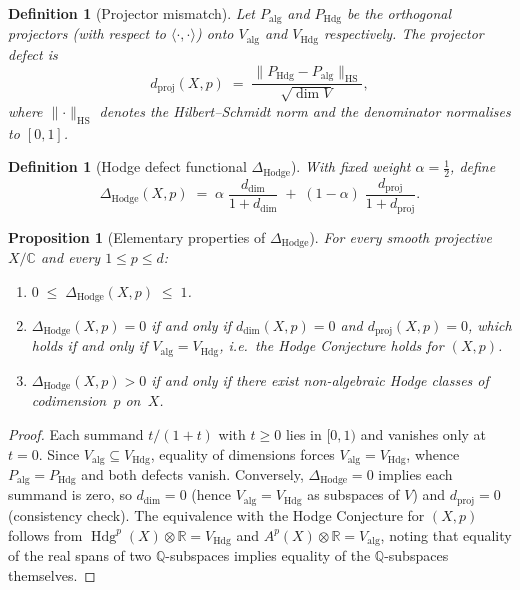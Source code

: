 \documentclass[11pt]{article}
\newtheorem{proposition}[theorem]{Proposition}
\newtheorem{definition}[theorem]{Definition}
\theoremstyle{definition}
\DeclareMathOperator{\Hdg}{Hdg}
\begin{document}
\begin{definition}[Projector mismatch]
\label{def:proj-mismatch}
Let $P_{\mathrm{alg}}$ and $P_{\mathrm{Hdg}}$ be the orthogonal
projectors (with respect to $\langle\cdot,\cdot\rangle$) onto
$V_{\mathrm{alg}}$ and $V_{\mathrm{Hdg}}$ respectively.  The
\emph{projector defect} is
\[
  d_{\mathrm{proj}}(X,p)
  \;=\;
  \frac{\lVert P_{\mathrm{Hdg}} - P_{\mathrm{alg}}\rVert_{\mathrm{HS}}}
       {\sqrt{\dim V}},
\]
where $\lVert\cdot\rVert_{\mathrm{HS}}$ denotes the Hilbert--Schmidt
norm and the denominator normalises to $[0,1]$.
\end{definition}

\begin{definition}[Hodge defect functional $\Delta_{\mathrm{Hodge}}$]
\label{def:delta-hodge}
With fixed weight $\alpha=\tfrac{1}{2}$, define
\[
  \Delta_{\mathrm{Hodge}}(X,p)
  \;=\;
  \alpha\;\frac{d_{\dim}}{1+d_{\dim}}
  \;+\;
  (1-\alpha)\;\frac{d_{\mathrm{proj}}}{1+d_{\mathrm{proj}}}.
\]
\end{definition}

\begin{proposition}[Elementary properties of $\Delta_{\mathrm{Hodge}}$]
\label{prop:delta-props}
For every smooth projective $X/\mathbb{C}$ and every $1\le p\le d$:
\begin{enumerate}[label=\textup{(\roman*)}]
  \item $0 \;\le\; \Delta_{\mathrm{Hodge}}(X,p) \;\le\; 1$.
  \item $\Delta_{\mathrm{Hodge}}(X,p) = 0$ if and only if
        $d_{\dim}(X,p) = 0$ and $d_{\mathrm{proj}}(X,p) = 0$,
        which holds if and only if
        $V_{\mathrm{alg}} = V_{\mathrm{Hdg}}$, i.e.\ the Hodge
        Conjecture holds for $(X,p)$.
  \item $\Delta_{\mathrm{Hodge}}(X,p) > 0$ if and only if there
        exist non-algebraic Hodge classes of codimension~$p$ on~$X$.
\end{enumerate}
\end{proposition}

\begin{proof}
Each summand $t/(1+t)$ with $t\ge 0$ lies in $[0,1)$ and vanishes
only at $t=0$.  Since
$V_{\mathrm{alg}}\subseteq V_{\mathrm{Hdg}}$, equality of dimensions
forces $V_{\mathrm{alg}}=V_{\mathrm{Hdg}}$, whence
$P_{\mathrm{alg}}=P_{\mathrm{Hdg}}$ and both defects vanish.
Conversely, $\Delta_{\mathrm{Hodge}}=0$ implies each summand is zero,
so $d_{\dim}=0$ (hence $V_{\mathrm{alg}}=V_{\mathrm{Hdg}}$ as
subspaces of $V$) and $d_{\mathrm{proj}}=0$ (consistency check).
The equivalence with the Hodge Conjecture for $(X,p)$ follows from
$\Hdg^{p}(X)\otimes\mathbb{R}=V_{\mathrm{Hdg}}$ and
$A^{p}(X)\otimes\mathbb{R}=V_{\mathrm{alg}}$, noting that equality
of the real spans of two $\mathbb{Q}$-subspaces implies equality of
the $\mathbb{Q}$-subspaces themselves.
\end{proof}
\end{document}
